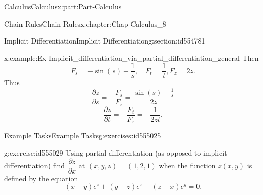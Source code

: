 \documentclass[oneside,10pt,]{book}
\numberwithin{equation}{section}
\begin{document}
\begin{partptx}{Calculus}{}{Calculus}{}{}{x:part:Part-Calculus}
\begin{chapterptx}{Chain Rules}{}{Chain Rules}{}{}{x:chapter:Chap-Calculus_8}
\begin{sectionptx}{Implicit Differentiation}{}{Implicit Differentiation}{}{}{g:section:id554781}
\begin{example}{}{x:example:Ex-Implicit_differentiation_via_partial_differentiation_general}
Then%
\begin{equation*}
F_s = -\sin(s)+\dfrac{1}{s}, \quad F_t=\dfrac{1}{t}, F_z=2z.
\end{equation*}
Thus%
\begin{equation*}
\dfrac{\partial z}{\partial s} = -\dfrac{F_s}{F_z} = \dfrac{\sin(s)-\frac{1}{s}}{2z}
\end{equation*}
%
\begin{equation*}
\dfrac{\partial z}{\partial t} = -\dfrac{F_t}{F_z}=-\dfrac{1}{2zt}.
\end{equation*}
%
\end{example}
%
%
\typeout{************************************************}
\typeout{************************************************}
%
\begin{exercises-subsection-numberless}{Example Tasks}{}{Example Tasks}{}{}{g:exercises:id555025}
\begin{divisionexercise}{1}{}{}{g:exercise:id555029}%
Using partial differentiation (as opposed to implicit differentiation) find \(\dfrac{\partial z}{\partial x}\) at \((x,y,z) = (1,2,1)\) when the function \(z(x,y)\) is defined by the equation%
\begin{equation*}
(x-y)e^z + (y-z)e^x + (z-x)e^y = 0.
\end{equation*}
\end{divisionexercise}%
\end{exercises-subsection-numberless}
\end{sectionptx}
\end{chapterptx}
\end{partptx}
%
%
\typeout{************************************************}
\typeout{************************************************}
%
\end{document}
